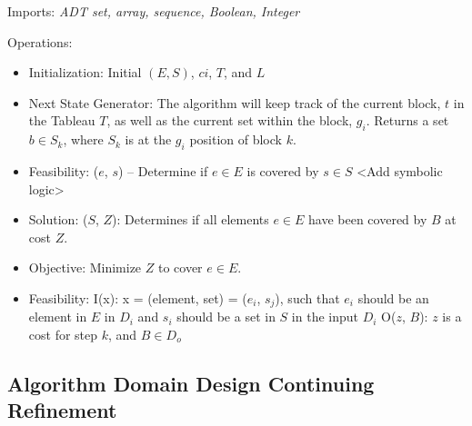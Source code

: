\documentclass[12pt]{article}
\begin{document}
	Imports: \textit{ADT set, array, sequence, Boolean, Integer}
	
	Operations:
	\begin{itemize}
		\item Initialization: Initial $(E, S)$, $ci$, $T$, and $L$
		\item Next State Generator: The algorithm will keep track of the current block, $t$ in the Tableau $T$, as well as the current set within the block, $g_i$. Returns a set $b \in S_k$, where $S_k$ is at the $g_i$ position of block $k$.
		\item Feasibility: ($e$, $s$) – Determine if $e \in E$ is covered by $s \in S$ <Add symbolic logic>
		\item Solution: ($S$, $Z$): Determines if all elements $e \in E$ have been covered by $B$ at cost $Z$.
		\item Objective: Minimize $Z$ to cover $e \in E$.
		\item Feasibility: I(x): x = (element, set) = ($e_i$, $s_j$), such that $e_i$ should be an element in $E$ in $D_i$ and $s_i$ should be a set in $S$ in the input $D_i$
		O($z$, $B$): $z$ is a cost for step $k$, and $B \in D_o$
	\end{itemize}
	
	\subsection{Algorithm Domain Design Continuing Refinement}
	
\end{document}
